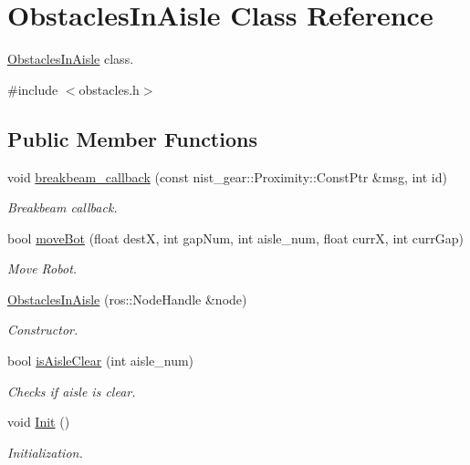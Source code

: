 \hypertarget{classObstaclesInAisle}{}\section{Obstacles\+In\+Aisle Class Reference}
\label{classObstaclesInAisle}


\hyperlink{classObstaclesInAisle}{Obstacles\+In\+Aisle} class.  




{\ttfamily \#include $<$obstacles.\+h$>$}

\subsection*{Public Member Functions}
\begin{DoxyCompactItemize}
\item 
void \hyperlink{classObstaclesInAisle_a62fe52625ce87d35a55f5c790ba45bb9}{breakbeam\+\_\+callback} (const nist\+\_\+gear\+::\+Proximity\+::\+Const\+Ptr \&msg, int id)
\begin{DoxyCompactList}\small\item\em Breakbeam callback. \end{DoxyCompactList}\item 
bool \hyperlink{classObstaclesInAisle_afeb7df3fceeec86c72b67e43c55bae84}{move\+Bot} (float destX, int gap\+Num, int aisle\+\_\+num, float currX, int curr\+Gap)
\begin{DoxyCompactList}\small\item\em Move Robot. \end{DoxyCompactList}\item 
\hyperlink{classObstaclesInAisle_a4d20a41862867ff7cdba73fad954cdb1}{Obstacles\+In\+Aisle} (ros\+::\+Node\+Handle \&node)
\begin{DoxyCompactList}\small\item\em Constructor. \end{DoxyCompactList}\item 
bool \hyperlink{classObstaclesInAisle_a30674dc5290f284f32ad2730dc0fb8a5}{is\+Aisle\+Clear} (int aisle\+\_\+num)
\begin{DoxyCompactList}\small\item\em Checks if aisle is clear. \end{DoxyCompactList}\item 
void \hyperlink{classObstaclesInAisle_a44704e14f7829f5e3a81e0f6595bab63}{Init} ()
\begin{DoxyCompactList}\small\item\em Initialization. \end{DoxyCompactList}\end{DoxyCompactItemize}
